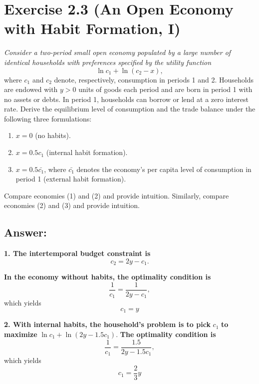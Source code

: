 \documentclass{article}
\begin{document}
\section*{Exercise 2.3 (An Open Economy with Habit Formation, I)}

\textit{Consider a two-period small open economy populated by a large number of identical households with preferences specified by the utility function}
\begin{equation}
    \ln c_1 + \ln (c_2 - x),
\end{equation}
where $c_1$ and $c_2$ denote, respectively, consumption in periods 1 and 2. Households are endowed with $y > 0$ units of goods each period and are born in period 1 with no assets or debts. In period 1, households can borrow or lend at a zero interest rate. Derive the equilibrium level of consumption and the trade balance under the following three formulations:

\begin{enumerate}
    \item $x = 0$ (no habits).
    \item $x = 0.5 c_1$ (internal habit formation).
    \item $x = 0.5 \bar{c_1}$, where $\bar{c_1}$ denotes the economy’s per capita level of consumption in period 1 (external habit formation).
\end{enumerate}

Compare economies (1) and (2) and provide intuition. Similarly, compare economies (2) and (3) and provide intuition.

\subsection*{Answer:}

\textbf{1. The intertemporal budget constraint is}
\begin{equation}
    c_2 = 2y - c_1.
\end{equation}

\textbf{In the economy without habits, the optimality condition is}
\begin{equation}
    \frac{1}{c_1} = \frac{1}{2y - c_1},
\end{equation}
which yields
\begin{equation}
    \boxed{c_1 = y}
\end{equation}

\textbf{2. With internal habits, the household’s problem is to pick} $c_1$ \textbf{to maximize} $\ln c_1 + \ln (2y - 1.5c_1)$. \textbf{The optimality condition is}
\begin{equation}
    \frac{1}{c_1} = \frac{1.5}{2y - 1.5c_1},
\end{equation}
which yields
\begin{equation}
    \boxed{c_1 = \frac{2}{3} y}
\end{equation}
\end{document}

